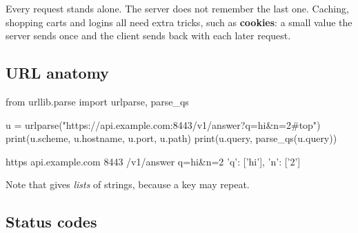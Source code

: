 \begin{keyidea}
Every request stands alone. The server does not remember the last one. Caching, shopping carts and
logins all need extra tricks, such as \textbf{cookies}: a small value the server sends once and
the client sends back with each later request.
\end{keyidea}

\subsection{URL anatomy}

\begin{center}
\end{center}

\begin{pycode}
from urllib.parse import urlparse, parse_qs

u = urlparse("https://api.example.com:8443/v1/answer?q=hi&n=2#top")
print(u.scheme, u.hostname, u.port, u.path)
print(u.query, parse_qs(u.query))
\end{pycode}
\begin{rawcode}
https api.example.com 8443 /v1/answer
q=hi&n=2 {'q': ['hi'], 'n': ['2']}
\end{rawcode}

Note that  gives \emph{lists} of strings, because a key may repeat.

\subsection{Status codes}

